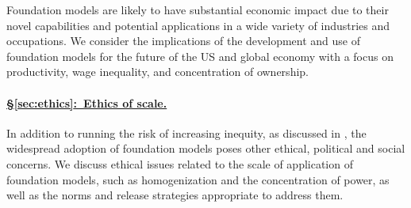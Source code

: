 Foundation models are likely to have substantial economic impact due to their novel capabilities and potential applications in a wide variety of industries and occupations. 
We consider the implications of the development and use of foundation models for the future of the US and global economy with a focus on productivity, wage inequality, and concentration of ownership.

\paragraph{\hyperref[sec:ethics]{§\ref{sec:ethics}:~Ethics of scale.}}

In addition to running the risk of increasing inequity, as discussed in , the widespread adoption of foundation models poses other ethical, political and social concerns.  We discuss ethical issues related to the scale of application of foundation models, such as homogenization and the concentration of power, as well as the norms and release strategies appropriate to address them.